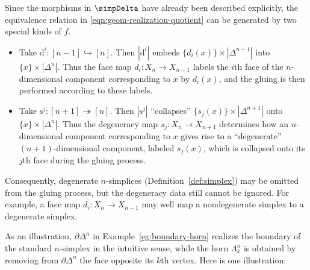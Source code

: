 Since the morphisms in $\simpDelta$ have already been described explicitly,
the equivalence relation in \eqref{eqn:geom-realization-quotient} can be
generated by two special kinds of $f$.
\begin{itemize}
	\item Take $\mathrm{d}^i:[n-1]\hookrightarrow[n]$. Then
	$|\mathrm{d}^i|$ embeds
	$\{d_i(x)\}\times|\Delta^{n-1}|$ into
	$\{x\}\times|\Delta^n|$. Thus the face map
	$d_i:X_n\to X_{n-1}$ labels the $i$th face of the $n$-dimensional
	component corresponding to $x$ by $d_i(x)$, and the gluing is then
	performed according to these labels.

	\item Take $\mathrm{s}^j:[n+1]\twoheadrightarrow[n]$. Then
	$|\mathrm{s}^j|$ ``collapses''
	$\{s_j(x)\}\times|\Delta^{n+1}|$ onto
	$\{x\}\times|\Delta^n|$. Thus the degeneracy map
	$s_j:X_n\to X_{n+1}$ determines how an $n$-dimensional component
	corresponding to $x$ gives rise to a ``degenerate'' $(n+1)$-dimensional
	component, labeled $s_j(x)$, which is collapsed onto its $j$th face during
	the gluing process.
\end{itemize}
Consequently, degenerate $n$-simplices (Definition~\ref{def:simplex}) may be
omitted from the gluing process, but the degeneracy data still cannot be
ignored. For example, a face map $d_i:X_n\to X_{n-1}$ may well map a
nondegenerate simplex to a degenerate simplex.

\begin{example}
	As an illustration, $\partial\Delta^n$ in Example~\ref{eg:boundary-horn}
	realizes the boundary of the standard $n$-simplex in the intuitive sense,
	while the horn $\Lambda^n_k$ is obtained by removing from
	$\partial\Delta^n$ the face opposite its $k$th vertex. Here is one
	illustration:
	\begin{center}\end{center}
\end{example}

